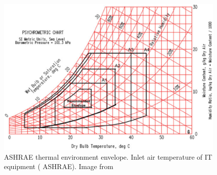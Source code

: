 \begin{figure} [!h]
\centering
\includegraphics[scale=.3]{methodology/images/psychrometric.eps}
\caption[ASHRAE thermal environment envelope]{ASHRAE thermal environment envelope. Inlet air temperature of IT equipment ( ASHRAE).  Image from \cite{joshi12}}
\label{psychrometric}
\end{figure}
